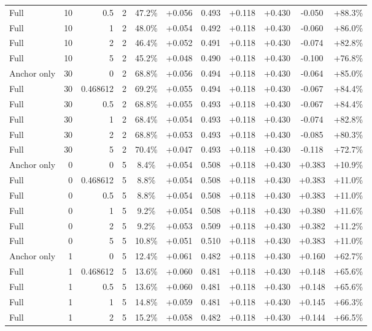 \begin{table}[htbp]
\begin{tabular}{lrrrccccccc}
Full & 10 & 0.5 & 2 & 47.2\% & +0.056 & 0.493 & +0.118 & +0.430 & -0.050 & +88.3\% \\
Full & 10 & 1 & 2 & 48.0\% & +0.054 & 0.492 & +0.118 & +0.430 & -0.060 & +86.0\% \\
Full & 10 & 2 & 2 & 46.4\% & +0.052 & 0.491 & +0.118 & +0.430 & -0.074 & +82.8\% \\
Full & 10 & 5 & 2 & 45.2\% & +0.048 & 0.490 & +0.118 & +0.430 & -0.100 & +76.8\% \\
Anchor only & 30 & 0 & 2 & 68.8\% & +0.056 & 0.494 & +0.118 & +0.430 & -0.064 & +85.0\% \\
Full & 30 & 0.468612 & 2 & 69.2\% & +0.055 & 0.494 & +0.118 & +0.430 & -0.067 & +84.4\% \\
Full & 30 & 0.5 & 2 & 68.8\% & +0.055 & 0.493 & +0.118 & +0.430 & -0.067 & +84.4\% \\
Full & 30 & 1 & 2 & 68.4\% & +0.054 & 0.493 & +0.118 & +0.430 & -0.074 & +82.8\% \\
Full & 30 & 2 & 2 & 68.8\% & +0.053 & 0.493 & +0.118 & +0.430 & -0.085 & +80.3\% \\
Full & 30 & 5 & 2 & 70.4\% & +0.047 & 0.493 & +0.118 & +0.430 & -0.118 & +72.7\% \\
Anchor only & 0 & 0 & 5 & 8.4\% & +0.054 & 0.508 & +0.118 & +0.430 & +0.383 & +10.9\% \\
Full & 0 & 0.468612 & 5 & 8.8\% & +0.054 & 0.508 & +0.118 & +0.430 & +0.383 & +11.0\% \\
Full & 0 & 0.5 & 5 & 8.8\% & +0.054 & 0.508 & +0.118 & +0.430 & +0.383 & +11.0\% \\
Full & 0 & 1 & 5 & 9.2\% & +0.054 & 0.508 & +0.118 & +0.430 & +0.380 & +11.6\% \\
Full & 0 & 2 & 5 & 9.2\% & +0.053 & 0.509 & +0.118 & +0.430 & +0.382 & +11.2\% \\
Full & 0 & 5 & 5 & 10.8\% & +0.051 & 0.510 & +0.118 & +0.430 & +0.383 & +11.0\% \\
Anchor only & 1 & 0 & 5 & 12.4\% & +0.061 & 0.482 & +0.118 & +0.430 & +0.160 & +62.7\% \\
Full & 1 & 0.468612 & 5 & 13.6\% & +0.060 & 0.481 & +0.118 & +0.430 & +0.148 & +65.6\% \\
Full & 1 & 0.5 & 5 & 13.6\% & +0.060 & 0.481 & +0.118 & +0.430 & +0.148 & +65.6\% \\
Full & 1 & 1 & 5 & 14.8\% & +0.059 & 0.481 & +0.118 & +0.430 & +0.145 & +66.3\% \\
Full & 1 & 2 & 5 & 15.2\% & +0.058 & 0.482 & +0.118 & +0.430 & +0.144 & +66.5\% \\

\end{tabular}
\end{table}
